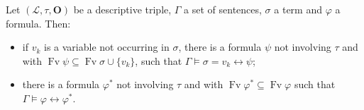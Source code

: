 Let $(\mathcal{L}, \tau, \mathbf{O})$ be a descriptive triple, $\Gamma$ a set of sentences, $\sigma$ a term and $\varphi$ a formula. Then:
\begin{itemize}
\item[(i)] if $v_k$ is a variable not occurring in $\sigma$, there is a formula $\psi$ not involving $\tau$ and with $\operatorname{Fv}\psi \subseteq \operatorname{Fv}\sigma \cup \{v_k\}$, such that $\Gamma \models \sigma = v_k \leftrightarrow \psi$;
\item[(ii)] there is a formula $\varphi^*$ not involving $\tau$ and with $\operatorname{Fv}\varphi^* \subseteq \operatorname{Fv}\varphi$ such that $\Gamma \models \varphi \leftrightarrow \varphi^*$.
\end{itemize}

